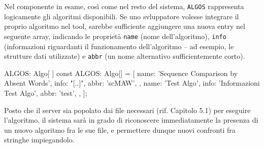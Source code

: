 Nel componente in esame, così come nel resto del sistema, \verb|ALGOS| rappresenta logicamente gli algoritmi disponibili. Se uno svluppatore volesse integrare il proprio algoritmo nel tool, sarebbe sufficiente aggiungere una nuova entry nel seguente array, indicando le proprietà \verb|name| (nome dell'algoritmo), \verb|info| (informazioni riguardanti il funzionamento dell'algoritmo -- ad esempio, le strutture dati utilizzate) e \verb|abbr| (un nome alternativo sufficientemente corto).

\begin{sexylisting}{ALGOS: Algo[ ]}
const ALGOS: Algo[] = [
  {
    name: 'Sequence Comparison by Absent Words',
	info: "[..]",
	abbr: 'scMAW',
  },
  {
    name: 'Test Algo',
	info: 'Informazioni Test Algo',
	abbr: 'test',
  },
];
\end{sexylisting}

Posto che il server sia popolato dai file necessari (rif. Capitolo 5.1) per eseguire l'algoritmo, il sistema sarà in grado di riconoscere immediatamente la presenza di un nuovo algoritmo fra le sue file, e permettere dunque nuovi confronti fra stringhe impiegandolo.